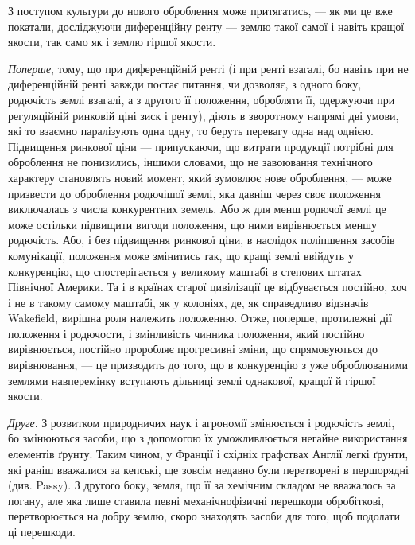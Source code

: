 
З поступом культури до нового оброблення може притягатись, — як ми це
вже покатали, досліджуючи диференційну ренту — землю такої самої і навіть
кращої якости, так само як і землю гіршої якости.

\emph{Поперше}, тому, що при диференційній ренті (і при ренті взагалі, бо
навіть при не диференційній ренті завжди постає питання, чи дозволяє, з одного
боку, родючість землі взагалі, а з другого її положення, обробляти її,
одержуючи при регуляційній ринковій ціні зиск і ренту), діють в зворотному
напрямі дві умови, які то взаємно паралізують одна одну, то беруть
перевагу одна над однією. Підвищення ринкової ціни — припускаючи, що витрати
продукції потрібні для оброблення не понизились, іншими словами, що
не завоювання технічного характеру становлять новий момент, який зумовлює
нове оброблення, — може призвести до оброблення родючішої землі, яка давніш
через своє положення виключалась з числа конкурентних земель. Або ж для
менш родючої землі це може остільки підвищити вигоди положення, що ними
вирівнюється меншу родючість. Або, і без підвищення ринкової ціни, в наслідок
поліпшення засобів комунікації, положення може змінитись так, що кращі землі
ввійдуть у конкуренцію, що спостерігається у великому маштабі в степових
штатах Північної Америки. Та і в країнах старої цивілізації це відбувається
постійно, хоч і не в такому самому маштабі, як у колоніях, де, як справедливо
відзначів Wakefield, вирішна роля належить положенню. Отже, поперше,
протилежні дії положення і родючости, і змінливість чинника положення, який
постійно вирівнюється, постійно проробляє прогресивні зміни, що спрямовуються
до вирівнювання, — це призводить до того, що в конкуренцію з уже оброблюваними
землями навперемінку вступають дільниці землі однакової, кращої й
гіршої якости.

\emph{Друге}. З розвитком природничих наук і агрономії змінюється і родючість
землі, бо змінюються засоби, що з допомогою їх уможливлюється негайне
використання елементів ґрунту. Таким чином, у Франції і східніх графствах
Англії легкі ґрунти, які раніш вважалися за кепські, ще зовсім недавно були
перетворені в першорядні (див. Passy). З другого боку, земля, що її за хемічним
складом не вважалось за погану, але яка лише ставила певні механічнофізичні
перешкоди обробіткові, перетворюється на добру землю, скоро знаходять
засоби для того, щоб подолати ці перешкоди.

